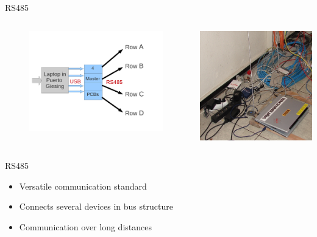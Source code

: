 \documentclass{beamer}
\begin{document}
  \begin{frame}{RS485}
    \begin{columns}
       \begin{column}{6cm}
        \begin{figure}
        \includegraphics[width=6cm, clip, trim= 1cm 3cm 4cm 2.5cm]{bilder/laptop.pdf}
        \end{figure}
      \end{column}
     \begin{column}{5cm}
        \includegraphics[width=5cm, clip, trim= 0cm 0cm 0cm 0cm]{bilder/laptop.jpg}
     \end{column}
   \end{columns}
   \begin{columns}
     \begin{column}{9cm}
       \begin{block}{RS485}
        \begin{itemize}
        \item \small Versatile communication standard
        \item \small Connects several devices in bus structure
        \item \small Communication over long distances
        \end{itemize}
       \end{block}
     \end{column}
   \end{columns}
  \end{frame}
\end{document}
